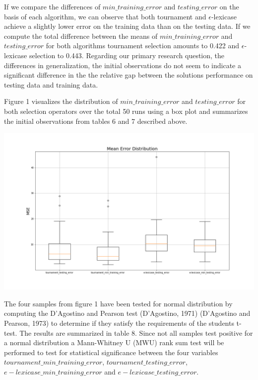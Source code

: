 \documentclass[
  12pt,
]{article}
\let\origfigure\figure
\let\endorigfigure\endfigure
\renewenvironment{figure}[1][2] {
    \expandafter\origfigure\expandafter[H]
} {
    \endorigfigure
}
\begin{document}
If we compare the differences of \(min\_training\_error\) and
\(testing\_error\) on the basis of each algorithm, we can observe that
both tournament and \(\epsilon\)-lexicase achieve a slightly lower error
on the training data than on the testing data. If we compute the total
difference between the means of \(min\_training\_error\) and
\(testing\_error\) for both algorithms tournament selection amounts to
0.422 and \(\epsilon\)-lexicase selection to 0.443. Regarding our
primary research question, the differences in generalization, the
initial observations do not seem to indicate a significant difference in
the the relative gap between the solutions performance on testing data
and training data.

Figure 1 visualizes the distribution of \(min\_training\_error\) and
\(testing\_error\) for both selection operators over the total 50 runs
using a box plot and summarizes the initial observations from tables 6
and 7 described above.

\begin{figure}
\centering
\includegraphics{./plots/mean_error_boxplot_all.png}
\caption{Distribution of Errors}
\end{figure}

The four samples from figure 1 have been tested for normal distribution
by computing the D'Agostino and Pearson test (D'Agostino, 1971)
(D'Agostino and Pearson, 1973) to determine if they satisfy the
requirements of the students t-test. The results are summarized in table
8. Since not all samples test positive for a normal distribution a
Mann-Whitney U (MWU) rank sum test will be performed to test for
statistical significance between the four variables
\(tournament\_min\_training\_error\), \(tournament\_testing\_error\),
\(e-lexicase\_min\_training\_error\) and \(e-lexicase\_testing\_error\).
\end{document}
